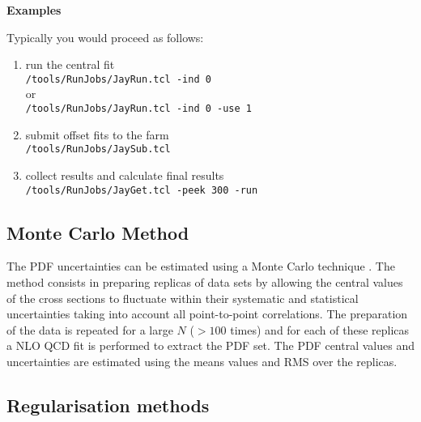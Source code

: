 \goodbreak
{\bf {Examples}}

Typically you would proceed as follows:
\begin{enumerate}
\item
run the central fit\\
\HF\verb'/tools/RunJobs/JayRun.tcl -ind 0'\\
or\\
\HF\verb'/tools/RunJobs/JayRun.tcl -ind 0 -use 1'
\item
submit offset fits to the farm\\
\HF\verb'/tools/RunJobs/JaySub.tcl'
\item
collect results and calculate final results\\
\HF\verb'/tools/RunJobs/JayGet.tcl -peek 300 -run'
\end{enumerate}



\subsection{Monte Carlo Method}
\label{sec:ToyMC}

The PDF uncertainties can be estimated using a Monte Carlo technique \cite{mcmethod}.
The method consists in preparing replicas of data sets by allowing the central values of the cross sections to 
fluctuate within their systematic and statistical uncertainties taking into account all point-to-point correlations.
The preparation of the data is repeated for a large $N$ ($>100$ times) and for each of these replicas a NLO QCD fit is performed to 
extract the PDF set. The PDF central values and uncertainties are estimated using the means values and RMS 
over the replicas. 



\subsection{Regularisation methods}


